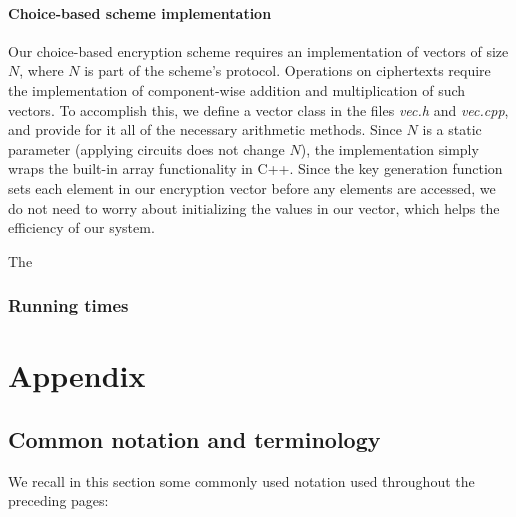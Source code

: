 \documentclass[11pt]{report}
\begin{document}
\subsubsection{Choice-based scheme implementation}
Our choice-based encryption scheme requires an implementation of vectors of size $N$, where $N$ is part of the scheme's protocol. Operations on ciphertexts require the implementation of component-wise addition and multiplication of such vectors. To accomplish this, we define a vector class in the files \emph{vec.h} and \emph{vec.cpp}, and provide for it all of the necessary arithmetic methods. Since $N$ is a static parameter (applying circuits does not change $N$), the implementation simply wraps the built-in array functionality in C++. Since the key generation function sets each element in our encryption vector before any elements are accessed, we do not need to worry about initializing the values in our vector, which helps the efficiency of our system.

The 

\subsection{Running times}

\chapter{Appendix}

\section{Common notation and terminology}

We recall in this section some commonly used notation used throughout the preceding pages:
\end{document}
